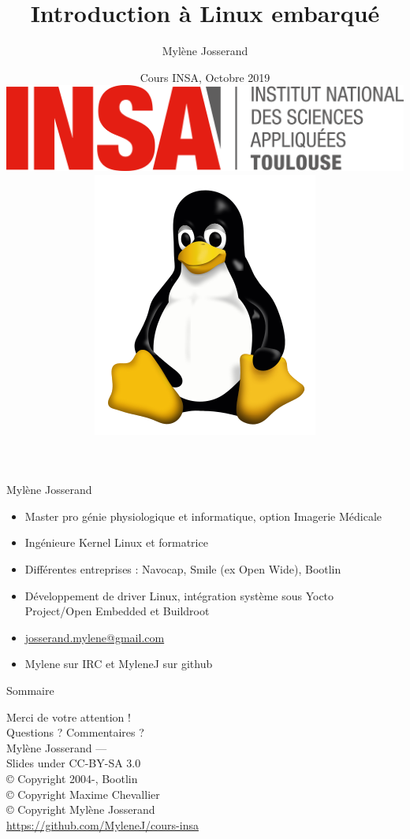 \documentclass[aspectratio=169,obeyspaces,spaces,hyphens,dvipsnames]{beamer}
\title{Introduction à Linux embarqué}
\author[Mylène Josserand]
{Mylène Josserand}
\date[Octobre 2019]
{Cours INSA, Octobre 2019 \\
  \vspace{0.5cm}
  \includegraphics[scale=0.1]{pictures/insa-tls.png}
  \hspace{0.5cm}
  \includegraphics[scale=0.1]{pictures/tux.png}
}
\institute[]
{Développeuse et formatrice Linux embarqué}
\begin{document}
\begin{frame}
  \titlepage
\end{frame}

\begin{frame}{Mylène Josserand}
  \begin{itemize}
  \item Master pro génie physiologique et informatique, option Imagerie Médicale
  \item Ingénieure Kernel Linux et formatrice
  \item Différentes entreprises : Navocap, Smile (ex Open Wide), Bootlin
  \item Développement de driver Linux, intégration système sous Yocto Project/Open Embedded et Buildroot
  \item \url{josserand.mylene@gmail.com}
  \item Mylene sur IRC et MyleneJ sur github
  \end{itemize}
\end{frame}

\begin{frame}{Sommaire}
  \tiny \tableofcontents%
\end{frame}







\begin{frame}
  \begin{center}
    \Huge
    Merci de votre attention ! \\
    Questions ? Commentaires ?\\
    \vspace{1cm}
    \large
    Mylène Josserand — \\
    \vspace{1cm}
    Slides under CC-BY-SA 3.0\\
    \scriptsize{© Copyright 2004-\the\year, Bootlin\\
    © Copyright Maxime Chevallier\\
    © Copyright Mylène Josserand\\
    \url{https://github.com/MyleneJ/cours-insa}}
  \end{center}
\end{frame}
\end{document}
